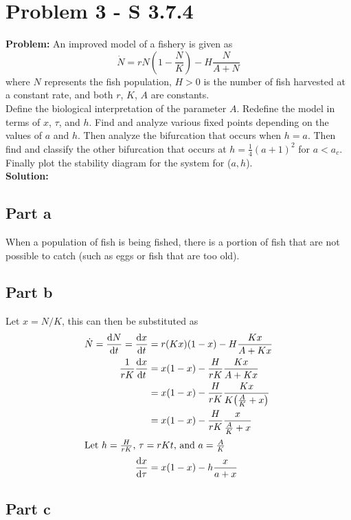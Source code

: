 \documentclass[letter]{article}
\begin{document}
\section{Problem 3 - S 3.7.4}
\textbf{Problem:}
An improved model of a fishery is given as
\begin{equation}
	\dot{N} = r N (1 - \frac{N}{K}) - H \frac{N}{A + N}
\end{equation}
where $N$ represents the fish population, $H > 0$ is the number of fish harvested at a constant rate, and both $r$, $K$, $A$ are constants.\\
Define the biological interpretation of the parameter $A$. Redefine the model in terms of $x$, $\tau$, and $h$. Find and analyze various fixed points depending on the values of $a$ and $h$. Then analyze the bifurcation that occurs when $h=a$. Then find and classify the other bifurcation that occurs at $h = \frac{1}{4} (a+1)^2$ for $a<a_c$. Finally plot the stability diagram for the system for ($a,h$).\\

\noindent
\textbf{Solution:}
\subsection{Part a}
When a population of fish is being fished, there is a portion of fish that are not possible to catch (such as eggs or fish that are too old).

\subsection{Part b}
Let $x = N / K$, this can then be substituted as
\begin{align}
	\dot{N} = \dv{N}{t} = \dv{x}{t}	
	&= r (K x) \qty(1 - x) - H\frac{K x}{A + K x}\\
	\frac{1}{r K} \dv{x}{t}
	&= x \qty(1 - x) - \frac{H}{r K}\frac{K x}{A + K x}\\
	&= x \qty(1 - x) - \frac{H}{r K}\frac{K x}{K\qty(\frac{A}{K} + x)}\\
	&= x \qty(1 - x) - \frac{H}{r K}\frac{x}{\frac{A}{K} + x}\\
	\intertext{Let $h = \frac{H}{r K}$, $\tau = r K t$, and $a = \frac{A}{K}$}
	\dv{x}{\tau} &= x (1 - x) - h \frac{x}{a + x}
\end{align}

\subsection{Part c}
\end{document}
